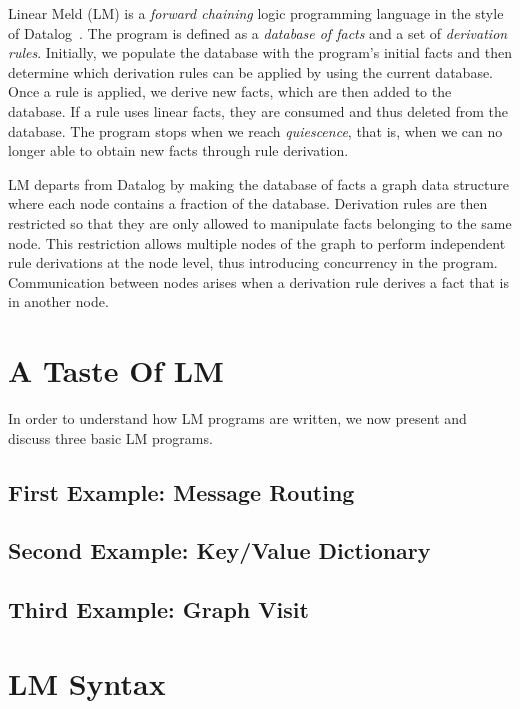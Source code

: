 
Linear Meld (LM) is a \emph{forward chaining} logic programming language in the
style of Datalog~\cite{Ullman:1990:PDK:533142}. The program is defined as a
\emph{database of facts} and a set of \emph{derivation rules}.  Initially, we
populate the database with the program's initial facts and then determine which
derivation rules can be applied by using the current database. Once a rule is
applied, we derive new facts, which are then added to the database.  If a rule
uses linear facts, they are consumed and thus deleted from the database.  The
program stops when we reach \emph{quiescence}, that is, when we can no longer
able to obtain new facts through rule derivation.

LM departs from Datalog by making the database of facts a graph data structure
where each node contains a fraction of the database. Derivation rules are then
restricted so that they are only allowed to manipulate facts belonging to the
same node. This restriction allows multiple nodes of the graph to perform
independent rule derivations at the node level, thus introducing concurrency in
the program. Communication between nodes arises when a derivation rule derives a
fact that is in another node.

\section{A Taste Of LM}

In order to understand how LM programs are written, we now present and discuss
three basic LM programs.

\subsection{First Example: Message Routing}\label{section:language:message}


\subsection{Second Example: Key/Value Dictionary}\label{sec:language:key_value}


\subsection{Third Example: Graph Visit}


\section{LM Syntax}

